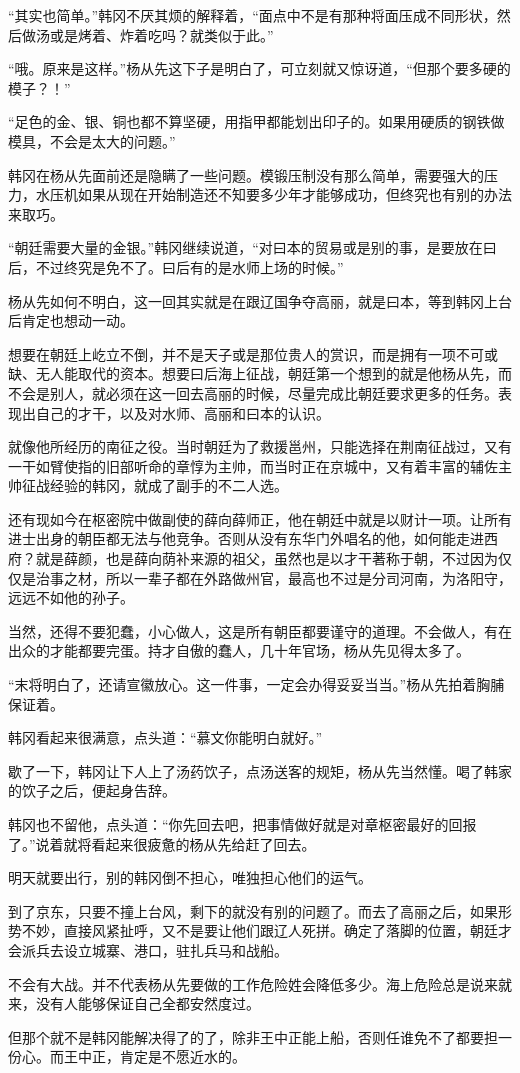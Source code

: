 “其实也简单。”韩冈不厌其烦的解释着，“面点中不是有那种将面压成不同形状，然后做汤或是烤着、炸着吃吗？就类似于此。”

“哦。原来是这样。”杨从先这下子是明白了，可立刻就又惊讶道，“但那个要多硬的模子？！”

“足色的金、银、铜也都不算坚硬，用指甲都能划出印子的。如果用硬质的钢铁做模具，不会是太大的问题。”

韩冈在杨从先面前还是隐瞒了一些问题。模锻压制没有那么简单，需要强大的压力，水压机如果从现在开始制造还不知要多少年才能够成功，但终究也有别的办法来取巧。

“朝廷需要大量的金银。”韩冈继续说道，“对曰本的贸易或是别的事，是要放在曰后，不过终究是免不了。曰后有的是水师上场的时候。”

杨从先如何不明白，这一回其实就是在跟辽国争夺高丽，就是曰本，等到韩冈上台后肯定也想动一动。

想要在朝廷上屹立不倒，并不是天子或是那位贵人的赏识，而是拥有一项不可或缺、无人能取代的资本。想要曰后海上征战，朝廷第一个想到的就是他杨从先，而不会是别人，就必须在这一回去高丽的时候，尽量完成比朝廷要求更多的任务。表现出自己的才干，以及对水师、高丽和曰本的认识。

就像他所经历的南征之役。当时朝廷为了救援邕州，只能选择在荆南征战过，又有一干如臂使指的旧部听命的章惇为主帅，而当时正在京城中，又有着丰富的辅佐主帅征战经验的韩冈，就成了副手的不二人选。

还有现如今在枢密院中做副使的薛向薛师正，他在朝廷中就是以财计一项。让所有进士出身的朝臣都无法与他竞争。否则从没有东华门外唱名的他，如何能走进西府？就是薛颜，也是薛向荫补来源的祖父，虽然也是以才干著称于朝，不过因为仅仅是治事之材，所以一辈子都在外路做州官，最高也不过是分司河南，为洛阳守，远远不如他的孙子。

当然，还得不要犯蠢，小心做人，这是所有朝臣都要谨守的道理。不会做人，有在出众的才能都要完蛋。持才自傲的蠢人，几十年官场，杨从先见得太多了。

“末将明白了，还请宣徽放心。这一件事，一定会办得妥妥当当。”杨从先拍着胸脯保证着。

韩冈看起来很满意，点头道：“慕文你能明白就好。”

歇了一下，韩冈让下人上了汤药饮子，点汤送客的规矩，杨从先当然懂。喝了韩家的饮子之后，便起身告辞。

韩冈也不留他，点头道：“你先回去吧，把事情做好就是对章枢密最好的回报了。”说着就将看起来很疲惫的杨从先给赶了回去。

明天就要出行，别的韩冈倒不担心，唯独担心他们的运气。

到了京东，只要不撞上台风，剩下的就没有别的问题了。而去了高丽之后，如果形势不妙，直接风紧扯呼，又不是要让他们跟辽人死拼。确定了落脚的位置，朝廷才会派兵去设立城寨、港口，驻扎兵马和战船。

不会有大战。并不代表杨从先要做的工作危险姓会降低多少。海上危险总是说来就来，没有人能够保证自己全都安然度过。

但那个就不是韩冈能解决得了的了，除非王中正能上船，否则任谁免不了都要担一份心。而王中正，肯定是不愿近水的。


